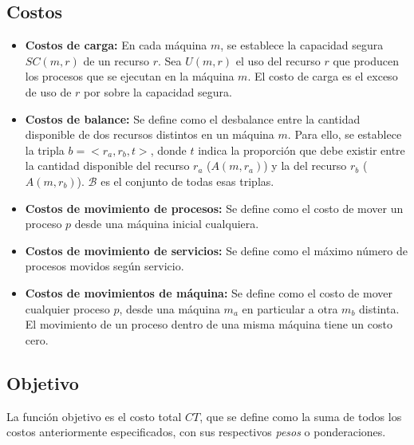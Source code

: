 \documentclass[../informe2.tex]{subfiles}
\begin{document}
\subsection{Costos}
\begin{itemize}
	\item \textbf{Costos de carga:} En cada máquina $m$, se establece la capacidad segura $SC(m,r)$ de un recurso $r$. Sea $U(m,r)$ el uso del recurso $r$ que producen los procesos que se ejecutan en la máquina $m$. El costo de carga es el exceso de uso de $r$ por sobre la capacidad segura.

	\item \textbf{Costos de balance:} Se define como el desbalance entre la cantidad disponible de dos recursos distintos en un máquina $m$. Para ello, se establece la tripla $b = <r_a,r_b,t>$, donde $t$ indica la proporción que debe existir entre la cantidad disponible del recurso $r_a$  ($A(m,r_a)$) y la del recurso $r_b$ ($A(m,r_b)$). $\mathcal{B}$ es el conjunto de todas esas triplas.

	\item \textbf{Costos de movimiento de procesos:} Se define como el costo de mover un proceso $p$ desde una máquina inicial cualquiera.

	\item \textbf{Costos de movimiento de servicios:} Se define como el máximo número de procesos movidos según servicio.

	\item \textbf{Costos de movimientos de máquina:} Se define como el costo de mover cualquier proceso $p$, desde una máquina $m_a$ en particular a otra $m_b$ distinta. El movimiento de un proceso dentro de una misma máquina tiene un costo cero.
\end{itemize}

\subsection{Objetivo}
La función objetivo es el costo total $CT$, que se define como la suma de todos los costos anteriormente especificados, con sus respectivos \textit{pesos} o ponderaciones.
\end{document}

